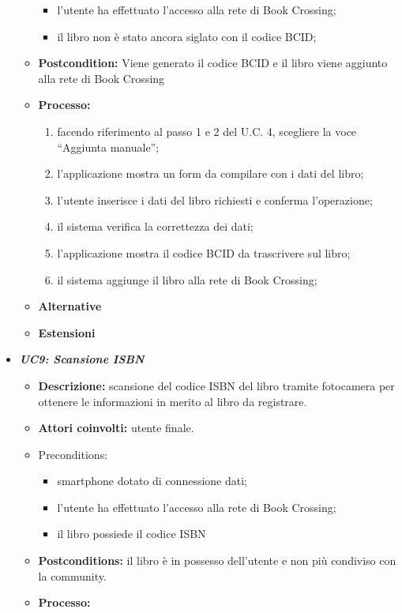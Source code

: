 \begin{itemize}
\begin{itemize}
\begin{itemize}
			\item l’utente ha effettuato l’accesso alla rete di Book Crossing;
			\item il libro non è stato ancora siglato con il codice BCID;
		\end{itemize}
		\item \textbf{Postcondition:} Viene generato il codice BCID e il libro viene aggiunto alla rete di Book Crossing
		\item \textbf{Processo: }
		\begin{enumerate}
			\item facendo riferimento al passo 1 e 2 del U.C. 4, scegliere la voce “Aggiunta manuale”;
			\item l’applicazione mostra un form da compilare con i dati del libro;
			\item l’utente inserisce i dati del libro richiesti e conferma l’operazione;
			\item il sistema verifica la correttezza dei dati;
			\item l’applicazione mostra il codice BCID da trascrivere sul libro;
			\item il sistema aggiunge il libro alla rete di Book Crossing;
		\end{enumerate}
		\item \textbf{Alternative}
		\item \textbf{Estensioni}
	\end{itemize}
	\item \textbf{\textit{UC9: Scansione ISBN}}
	\begin{itemize}
		\item \textbf{Descrizione:} scansione del codice ISBN del libro tramite fotocamera per ottenere le informazioni in merito al libro da registrare.
		\item \textbf{Attori coinvolti:} utente finale.
		\item {Preconditions:} 
		\begin{itemize}
			\item smartphone dotato di connessione dati;
			\item l’utente ha effettuato l’accesso alla rete di Book Crossing;
			\item il libro possiede il codice ISBN
		\end{itemize}
		\item \textbf{Postconditions:} il libro è in possesso dell'utente e non più condiviso con la community.
		\item \textbf{Processo:}
		\begin{enumerate}

\end{enumerate}
\end{itemize}
\end{itemize}
